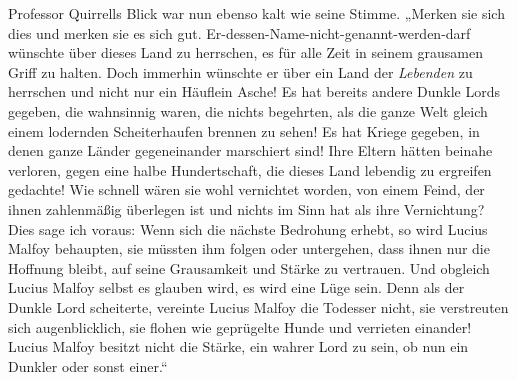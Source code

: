 Professor Quirrells Blick war nun ebenso kalt wie seine Stimme.
„Merken sie sich dies und merken sie es sich gut. Er-dessen-Name-nicht-genannt-werden-darf wünschte über dieses Land zu herrschen, es für alle Zeit in seinem grausamen Griff zu halten. Doch immerhin wünschte er über ein Land der \emph{Lebenden} zu herrschen und nicht nur ein Häuflein Asche! Es hat bereits andere Dunkle Lords gegeben, die wahnsinnig waren, die nichts begehrten, als die ganze Welt gleich einem lodernden Scheiterhaufen brennen zu sehen! Es hat Kriege gegeben, in denen ganze Länder gegeneinander marschiert sind! Ihre Eltern hätten beinahe verloren, gegen eine halbe Hundertschaft, die dieses Land lebendig zu ergreifen gedachte! Wie schnell wären sie wohl vernichtet worden, von einem Feind, der ihnen zahlenmäßig überlegen ist und nichts im Sinn hat als ihre Vernichtung? Dies sage ich voraus: Wenn sich die nächste Bedrohung erhebt, so wird Lucius Malfoy behaupten, sie müssten ihm folgen oder untergehen, dass ihnen nur die Hoffnung bleibt, auf seine Grausamkeit und Stärke zu vertrauen. Und obgleich Lucius Malfoy selbst es glauben wird, es wird eine Lüge sein. Denn als der Dunkle Lord scheiterte, vereinte Lucius Malfoy die Todesser nicht, sie verstreuten sich augenblicklich, sie flohen wie geprügelte Hunde und verrieten einander! Lucius Malfoy besitzt nicht die Stärke, ein wahrer Lord zu sein, ob nun ein Dunkler oder sonst einer.“

